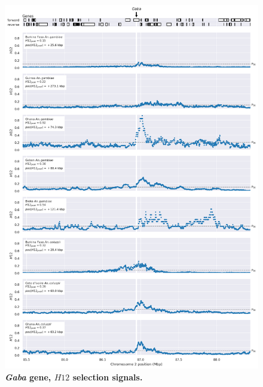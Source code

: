 \documentclass[a4paper,11pt,abstracton,hidelinks]{scrartcl}
\begin{document}
\clearpage


\begin{figure}[t!]
	\begin{center}
		\includegraphics*[width=1\linewidth,center]{artwork/locus_gaba_h12_pdist.png}
	\end{center}
	\caption[\textit{Gaba} gene, $H12$ selection signals]{
	\textbf{\textit{Gaba} gene, $H12$ selection signals.}
	} 
	\label{fig:locus_gaba_h12}
\end{figure}


\clearpage
\end{document}
